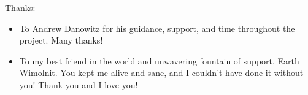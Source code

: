 \noindent
Thanks:
\begin{itemize}
    \item To Andrew Danowitz for his guidance, support, and time throughout the project. Many thanks!
    \item To my best friend in the world and unwavering fountain of support, Earth Wimolnit. You kept me alive and sane, and I couldn't have done it without you! Thank you and I love you!
\end{itemize}
